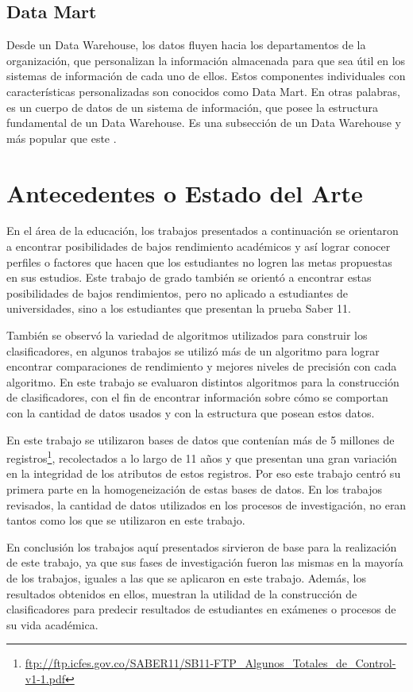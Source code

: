\subsection{Data Mart}
Desde un Data Warehouse, los datos fluyen hacia los departamentos de la organización, que personalizan la información almacenada para que sea útil en los sistemas de información de cada uno de ellos. Estos componentes individuales con características personalizadas son conocidos como Data Mart. En otras palabras, es un cuerpo de datos de un sistema de información, que posee la estructura fundamental de un Data Warehouse. Es una subsección de un Data Warehouse y más popular que este \cite{key-90}.
\section{Antecedentes o Estado del Arte}
En el área de la educación, los trabajos presentados a continuación se orientaron a encontrar posibilidades de bajos rendimiento académicos y así lograr conocer perfiles o factores que hacen que los estudiantes no logren las metas propuestas en sus estudios. Este trabajo de grado también se orientó a encontrar estas posibilidades de bajos rendimientos, pero no aplicado a estudiantes de universidades, sino a los estudiantes que presentan la prueba Saber 11\degree.

También se observó la variedad de algoritmos utilizados para construir los clasificadores, en algunos trabajos se utilizó más de un algoritmo para lograr encontrar comparaciones de rendimiento y mejores niveles de precisión con cada algoritmo. En este trabajo se evaluaron distintos algoritmos para la construcción de clasificadores, con el fin de encontrar información sobre cómo se comportan con la cantidad de datos usados y con la estructura que posean estos datos.

En este trabajo se utilizaron bases de datos que contenían más de 5 millones de registros\footnote{\url{ftp://ftp.icfes.gov.co/SABER11/SB11-FTP_Algunos_Totales_de_Control-v1-1.pdf}}, recolectados a lo largo de 11 años y que presentan una gran variación en la integridad de los atributos de estos registros. Por eso este trabajo centró su primera parte en la homogeneización de estas bases de datos. En los trabajos revisados, la cantidad de datos utilizados en los procesos de investigación, no eran tantos como los que se utilizaron en este trabajo.

En conclusión los trabajos aquí presentados sirvieron de base para la realización de este trabajo, ya que sus fases de investigación fueron las mismas en la mayoría de los trabajos, iguales a las que se aplicaron en este trabajo. Además, los resultados obtenidos en ellos, muestran la utilidad de la construcción de clasificadores para predecir resultados de estudiantes en exámenes o procesos de su vida académica.
